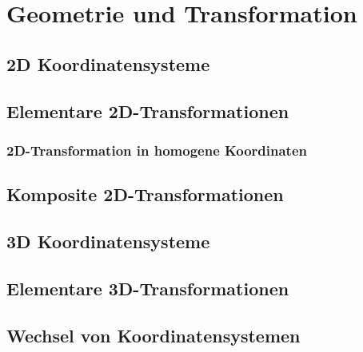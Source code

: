 \chapter{Geometrie und Transformation}

\section{2D Koordinatensysteme}
\section{Elementare 2D-Transformationen}
\subsection{2D-Transformation in homogene Koordinaten}

\section{Komposite 2D-Transformationen}

\section{3D Koordinatensysteme}

\section{Elementare 3D-Transformationen}

\section{Wechsel von Koordinatensystemen}

